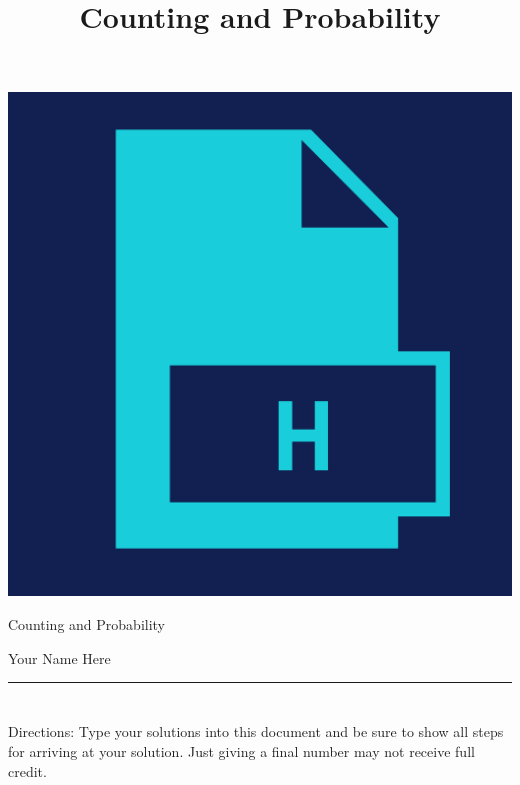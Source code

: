 \documentclass{amsart}
\theoremstyle{definition}
\theoremstyle{Exercise}
\theoremstyle{remark}
\theoremstyle{rule}
\numberwithin{equation}{section}
\begin{document}
\begin{center}
\includegraphics[scale=.1]{logo.png}
\end{center}
\title{\sf Counting and Probability}%


\maketitle
Counting and Probability
\begin{center}
Your Name Here
\end{center}


\begin{center}
\rule{\textwidth}{0.4pt}
\end{center}


\newpage
\section*{}
\section*{}
Directions: Type your solutions into this document and be sure to show all steps for arriving at your solution. Just giving a final number may not receive full credit.
\\\\
\end{document}

